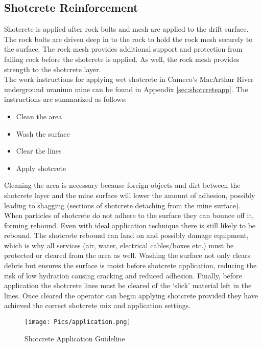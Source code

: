 \subsection{Shotcrete Reinforcement}

Shotcrete is applied after rock bolts and mesh are applied to the drift surface. The rock bolts are driven deep in to the rock to hold the rock mesh securely to the surface. The rock mesh provides additional support and protection from falling rock before the shotcrete is applied. As well, the rock mesh provides strength to the shotcrete layer.\\

The work instructions for applying wet shotcrete in Cameco's MacArthur River underground uranium mine can be found in Appendix \ref{sec:shotcreteapp}. The instructions are summarized as follows:
\begin{itemize}
\item Clean the area
\item Wash the surface
\item Clear the lines
\item Apply shotcrete
\end{itemize}

Cleaning the area is necessary because foreign objects and dirt between the shotcrete layer and the mine surface will lower the amount of adhesion, possibly leading to shagging (sections of shotcrete detaching from the mine surface). When particles of shotcrete do not adhere to the surface they can bounce off it, forming rebound. Even with ideal application technique there is still likely to be rebound. The shotcrete rebound can land on and possibly damage equipment, which is why all services (air, water, electrical cables/boxes etc.) must be protected or cleared from the area as well. Washing the surface not only clears debris but ensures the surface is moist before shotcrete application, reducing the risk of low hydration causing cracking and reduced adhesion. Finally, before application the shotcrete lines must be cleared of the `slick' material left in the lines. Once cleared the operator can begin applying shotcrete provided they have achieved the correct shotcrete mix and application settings.\\

\begin{figure}[h!]
    \centering
    \texttt{[image: Pics/application.png]}
    \caption{Shotcrete Application Guideline \cite{camedoc}}
    \label{fig:instshot}
\end{figure}

